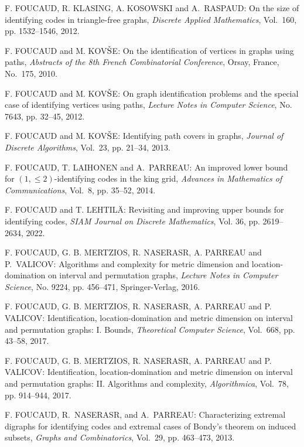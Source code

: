 \begin{thebibliography}{999}
F. FOUCAUD, R. KLASING, A. KOSOWSKI and A.~RASPAUD: On the size of identifying codes in triangle-free graphs, {\it Discrete Applied Mathematics}, Vol.~160, pp. 1532--1546, 2012.

F. FOUCAUD and M. KOV$\check{\rm S}$E: On the identification of vertices in graphs using paths, {\it Abstracts of the 8th French Combinatorial Conference}, Orsay, France, No.~175, 2010.

F. FOUCAUD and M. KOV$\check{\rm S}$E: On graph identification problems and the special case of identifying vertices using paths, {\it Lecture Notes in Computer Science}, No. 7643, pp. 32--45, 2012.

F. FOUCAUD and M. KOV$\check{\rm S}$E: Identifying path covers in graphs, {\it Journal of Discrete Algorithms}, Vol.~23, pp. 21--34, 2013.

F. FOUCAUD, T. LAIHONEN and A.~PARREAU: An improved lower bound for $(1, \leq 2)$-identifying codes in the king grid, {\it Advances in Mathematics of Communications}, Vol.~8, pp. 35--52, 2014.

F. FOUCAUD and T. LEHTIL\"A: Revisiting and improving upper bounds for identifying codes, {\it SIAM Journal on Discrete Mathematics}, Vol. 36, pp. 2619--2634, 2022.

F. FOUCAUD, G. B. MERTZIOS, R. NASERASR, A. PARREAU and P.~VALICOV: Algorithms and complexity for metric dimension and location-domination on interval and permutation graphs, {\it Lecture Notes in Computer Science}, No. 9224, pp. 456--471, Springer-Verlag, 2016.

F. FOUCAUD, G. B. MERTZIOS, R. NASERASR, A. PARREAU and P. VALICOV: Identification, location-domination and metric dimension on interval and permutation graphs: I. Bounds, {\it Theoretical Computer Science}, Vol.~668, pp. 43--58, 2017.

F. FOUCAUD, G. B. MERTZIOS, R. NASERASR, A. PARREAU and P. VALICOV: Identification, location-domination and metric dimension on interval and permutation graphs: II. Algorithms and complexity, {\it Algorithmica}, Vol.~78, pp. 914--944, 2017.

F. FOUCAUD, R.~NASERASR, and A.~PARREAU: Characterizing extremal digraphs for identifying codes and extremal cases of Bondy's theorem on induced subsets, {\it Graphs and Combinatorics}, Vol.~29, pp. 463--473, 2013.


\end{thebibliography}
